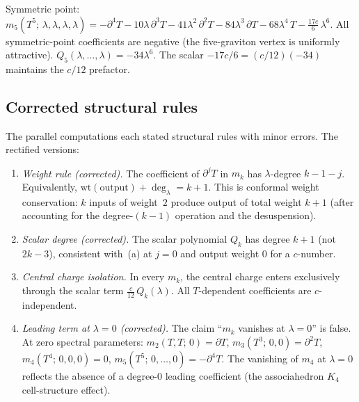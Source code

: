 \documentclass[11pt]{article}
\begin{document}
Symmetric point:
$m_5(T^5;\,\lambda,\lambda,\lambda,\lambda)
= -\partial^4 T
- 10\lambda\,\partial^3 T
- 41\lambda^2\,\partial^2 T
- 84\lambda^3\,\partial T
- 68\lambda^4\, T
- \tfrac{17c}{6}\,\lambda^6$.
All symmetric-point coefficients are negative (the
five-graviton vertex is uniformly attractive).
$Q_5(\lambda,\ldots,\lambda) = -34\lambda^6$.
The scalar $-17c/6 = (c/12)(-34)$ maintains the
$c/12$ prefactor.

\subsection{Corrected structural rules}

The parallel computations each stated structural rules
with minor errors.  The rectified versions:

\begin{enumerate}[label=\textup{(\alph*)},nosep]
\item \textit{Weight rule (corrected).}
  The coefficient of $\partial^j T$ in $m_k$ has
  $\lambda$-degree $k - 1 - j$.  Equivalently,
  $\mathrm{wt}(\text{output}) + \deg_\lambda = k + 1$.
  This is conformal weight conservation:
  $k$ inputs of weight~$2$ produce output of total
  weight $k + 1$ (after accounting for the degree-$(k-1)$
  operation and the desuspension).

\item \textit{Scalar degree (corrected).}
  The scalar polynomial $Q_k$ has degree $k + 1$
  (not $2k - 3$), consistent with~(a) at $j = 0$
  and output weight $0$ for a $c$-number.

\item \textit{Central charge isolation.}
  In every $m_k$, the central charge enters exclusively through
  the scalar term $\tfrac{c}{12}\,Q_k(\lambda)$.  All
  $T$-dependent coefficients are $c$-independent.

\item \textit{Leading term at $\lambda = 0$ (corrected).}
  The claim ``$m_k$ vanishes at $\lambda = 0$'' is false.
  At zero spectral parameters:
  $m_2(T,T;\,0) = \partial T$,
  $m_3(T^3;\,0,0) = \partial^2 T$,
  $m_4(T^4;\,0,0,0) = 0$,
  $m_5(T^5;\,0,\ldots,0) = -\partial^4 T$.
  The vanishing of $m_4$ at $\lambda = 0$ reflects the absence of
  a degree-$0$ leading coefficient (the associahedron $K_4$
  cell-structure effect).
\end{enumerate}
\end{document}
